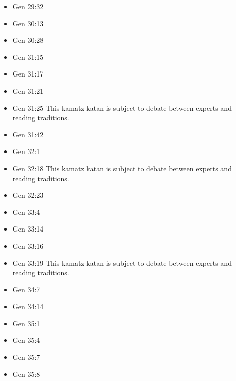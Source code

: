 \documentclass[14pt]{article}
\begin{document}
\begin{multicols}{2}
\begin{itemize}
\item Gen 29:32

\item Gen 30:13

\item Gen 30:28

\item Gen 31:15

\item Gen 31:17

\item Gen 31:21

\item Gen 31:25 This kamatz katan is subject to debate between experts and reading traditions.

\item Gen 31:42

\item Gen 32:1

\item Gen 32:18 This kamatz katan is subject to debate between experts and reading traditions.

\item Gen 32:23

\item Gen 33:4

\item Gen 33:14

\item Gen 33:16

\item Gen 33:19 This kamatz katan is subject to debate between experts and reading traditions.

\item Gen 34:7

\item Gen 34:14

\item Gen 35:1

\item Gen 35:4

\item Gen 35:7

\item Gen 35:8


\end{itemize}
\end{multicols}
\end{document}
